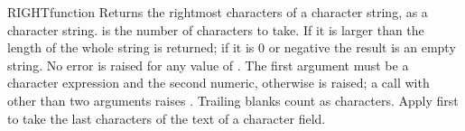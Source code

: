 \begin{XbaseEntry}{RIGHT}{function}
Returns the rightmost characters of a character string, as a character string.
\Syntax
{}
\Usage
{} is the number of characters to take. If it is larger than the length of  the whole string is returned; if it is 0 or negative the result is an empty string. No error is raised for any value of . The first argument must be a character expression and the second numeric, otherwise  is raised; a call with other than two arguments raises .
\Tips
Trailing blanks count as characters. Apply  first to take the last characters of the text of a character field.
\Examples
{}
\end{XbaseEntry}

